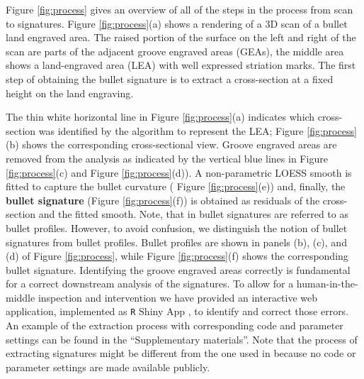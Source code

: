 Figure \ref{fig:process} gives an overview of all of the steps in the
process from scan to signatures. Figure \ref{fig:process}(a) shows a
rendering of a 3D scan of a bullet land engraved area. The raised
portion of the surface on the left and right of the scan are parts of
the adjacent groove engraved areas (GEAs), the middle area shows a
land-engraved area (LEA) with well expressed striation marks. The first
step of obtaining the bullet signature is to extract a cross-section at
a fixed height on the land engraving.

The thin white horizontal line in Figure \ref{fig:process}(a) indicates
which cross-section was identified by the algorithm to represent the
LEA; Figure \ref{fig:process}(b) shows the corresponding cross-sectional
view. Groove engraved areas are removed from the analysis as indicated
by the vertical blue lines in Figure \ref{fig:process}(c) and Figure
\ref{fig:process}(d)). A non-parametric LOESS smooth \citep{loess} is
fitted to capture the bullet curvature ( Figure \ref{fig:process}(e))
and, finally, the \textbf{bullet signature} (Figure
\ref{fig:process}(f)) is obtained as residuals of the cross-section and
the fitted smooth. Note, that in \citet{cmps} bullet signatures are
referred to as bullet profiles. However, to avoid confusion, we
distinguish the notion of bullet signatures from bullet profiles. Bullet
profiles are shown in panels (b), (c), and (d) of Figure
\ref{fig:process}, while Figure \ref{fig:process}(f) shows the
corresponding bullet signature. Identifying the groove engraved areas
correctly is fundamental for a correct downstream analysis of the
signatures. To allow for a human-in-the-middle inspection and
intervention we have provided an interactive web application,
implemented as \texttt{R} Shiny App \citep{shiny}, 
to identify and correct those errors. An example of the extraction
process with corresponding code and parameter settings can be found in
the ``Supplementary materials''. Note that the process of extracting
signatures might be different from the one used in \citet{cmps} because
no code or parameter settings are made available publicly.

